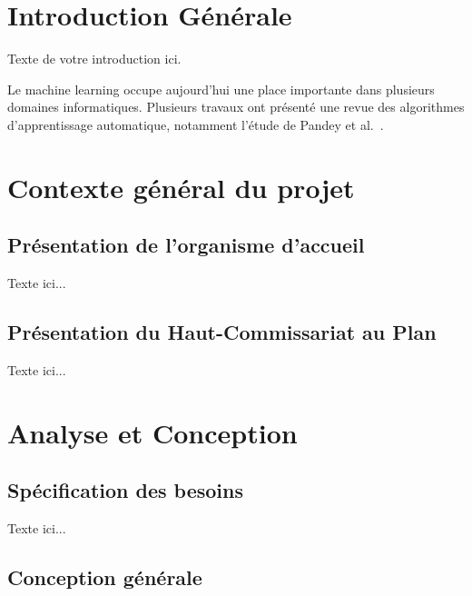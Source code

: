 \documentclass[12pt,a4paper,oneside]{report}
\begin{document}
\newpage
\tableofcontents

\newpage
\listoffigures

\newpage
\listoftables

\newpage
\printnomenclature

\clearpage
{}

\chapter*{Introduction Générale}

Texte de votre introduction ici.

Le machine learning occupe aujourd’hui une place importante dans plusieurs domaines informatiques. Plusieurs travaux ont présenté une revue des algorithmes d’apprentissage automatique, notamment l’étude de Pandey et al.~\cite{pandey2019machine}.

\chapter{Contexte général du projet}

\section{Présentation de l'organisme d'accueil}

Texte ici...

\section{Présentation du Haut-Commissariat au Plan}

Texte ici...

\chapter{Analyse et Conception}

\section{Spécification des besoins}

Texte ici...

\section{Conception générale}
\end{document}
